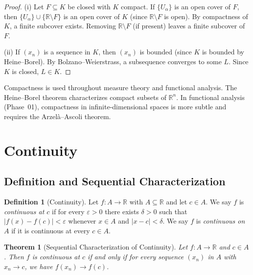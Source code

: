 \documentclass[11pt,a4paper]{article}
\theoremstyle{definition}
\newtheorem{definition}{Definition}[section]
\theoremstyle{plain}
\newtheorem{theorem}{Theorem}[section]
\theoremstyle{remark}
\newcommand{\R}{\mathbb{R}}
\begin{document}
\begin{proof}
(i) Let $F \subseteq K$ be closed with $K$ compact. If $\{U_\alpha\}$ is an open
cover of $F$, then $\{U_\alpha\} \cup \{\R \setminus F\}$ is an open cover of $K$
(since $\R \setminus F$ is open). By compactness of $K$, a finite subcover exists.
Removing $\R \setminus F$ (if present) leaves a finite subcover of $F$.

(ii) If $(x_n)$ is a sequence in $K$, then $(x_n)$ is bounded (since $K$ is bounded
by Heine--Borel). By Bolzano--Weierstrass, a subsequence converges to some $L$.
Since $K$ is closed, $L \in K$.
\end{proof}

\begin{rlconnection}[Compactness Beyond $\R^n$]
Compactness is used throughout measure theory and functional analysis. The
Heine--Borel theorem characterizes compact subsets of $\R^n$. In functional
analysis (Phase~01), compactness in infinite-dimensional spaces is more subtle
and requires the Arzel\`{a}--Ascoli theorem.
\end{rlconnection}

\section{Continuity}
\label{sec:continuity}

\subsection{Definition and Sequential Characterization}
\label{subsec:cont_def}

\begin{definition}[Continuity]
\label{def:continuity}
Let $f : A \to \R$ with $A \subseteq \R$ and let $c \in A$. We say $f$ is
\emph{continuous at $c$} if for every $\varepsilon > 0$ there exists $\delta > 0$
such that $|f(x) - f(c)| < \varepsilon$ whenever $x \in A$ and $|x - c| < \delta$.
We say $f$ is \emph{continuous on $A$} if it is continuous at every $c \in A$.
\end{definition}

\begin{theorem}[Sequential Characterization of Continuity]
\label{thm:seq_continuity}
Let $f : A \to \R$ and $c \in A$. Then $f$ is continuous at $c$ if and only if
for every sequence $(x_n)$ in $A$ with $x_n \to c$, we have $f(x_n) \to f(c)$.
\end{theorem}
\end{document}
